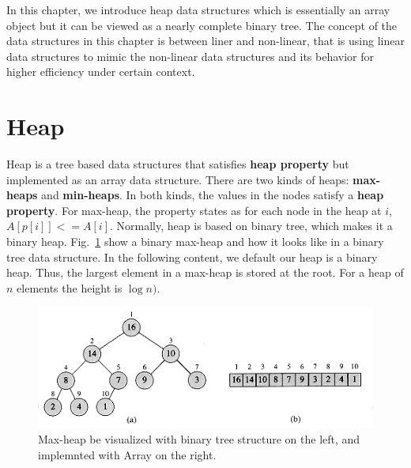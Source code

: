 \documentclass[main.tex]{subfiles}
\begin{document}
In this chapter, we introduce heap data structures which is essentially an array object but it can be viewed as a nearly complete binary tree. The concept of the data structures in this chapter is between liner and non-linear, that is using linear data structures to mimic the non-linear data structures and its behavior for higher efficiency under certain context. 
\section{Heap}
\label{sec_heap}
Heap is a tree based data structures that satisfies \textbf{heap property} but implemented as an array data structure. There are two kinds of heaps: \textbf{max-heaps} and \textbf{min-heaps}. In both kinds, the values in the nodes satisfy a \textbf{heap property}. For max-heap, the property states as for each node in the heap at $i$, $A[p[i]] <= A[i]$.  Normally, heap is based on binary tree, which makes it a binary heap. Fig.~\ref{fig:max-heap-1} show a binary max-heap and how it looks like in a binary tree data structure. In the following content, we default our heap is a binary heap. Thus, the largest element in a max-heap is stored at the root. For a heap of $n$ elements the height is $\log n)$. %
\begin{figure}[h!]
    \centering
    \includegraphics[width = 0.98\columnwidth]{fig/binary_tree.png}
    \caption{Max-heap be visualized with binary tree structure on the left, and implemnted with Array on the right.}
    \label{fig:max-heap-1}
\end{figure}
\end{document}
